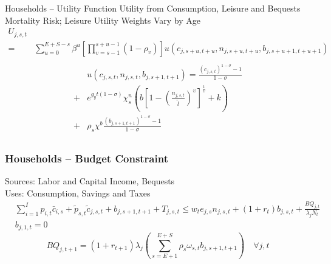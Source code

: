 \documentclass{beamer}
\begin{document}
  \begin{frame}{Households -- Utility Function}\label{Utility Function}
    Utility from Consumption, Leisure and Bequests \\
    Mortality Risk;  Leisure Utility Weights Vary by Age
    \begin{equation}
      \begin{split}
        U_{j,s,t} \\
        = & \sum_{u=0}^{E+S-s}\beta^u\left[\prod_{v=s-1}^{s+u-1}(1-\rho_v)\right] u\left(c_{j,s+u,t+u},n_{j,s+u,t+u},b_{j,s+u+1,t+u+1}\right) \nonumber \\
      \end{split}
    \end{equation}
    \begin{equation}
      \begin{split}
        & u\left(c_{j,s,t},n_{j,s,t},b_{j,s+1,t+1}\right) = \frac{\left(c_{j,s,t}\right)^{1-\sigma} - 1}{1-\sigma} \\
        + & e^{g_y t(1-\sigma)}\chi^n_s\left(b\left[1 - \left(\frac{n_{j,s,t}}{\tilde{l}}\right)^\upsilon\right]^\frac{1}{\upsilon} + k\right) \\
        + & \rho_s\chi^b\frac{\left(b_{j,s+1,t+1}\right)^{1-\sigma} - 1}{1-\sigma} \nonumber \\
      \end{split}
    \end{equation}
    \hyperlink{elliptic}{}
  \end{frame}

  \begin{frame}
    \frametitle{Households -- Budget Constraint}
    Sources: Labor and Capital Income, Bequests \\
    Uses: Consumption, Savings and Taxes
    \begin{equation}
      \begin{split}
        & \sum_{i=1}^{I}p_{i,t}\bar{c}_{i,s} + \tilde{p}_{s,t}\tilde{c}_{j,s,t} + b_{j,s+1,t+1} + T_{j,s,t} \leq  w_t e_{j,s}n_{j,s,t} + \left(1 + r_t\right) b_{j,s,t} + \frac{BQ_{j,t}}{\lambda_jN_t}  \\
        & b_{j,1,t} = 0  \nonumber
      \end{split}
    \end{equation}
    \begin{equation}
      BQ_{j,t+1} = (1+r_{t+1})\lambda_j\left(\sum_{s=E+1}^{E+S}\rho_s\omega_{s,t}b_{j,s+1,t+1}\right) \quad\forall j,t \nonumber
    \end{equation}
  \end{frame}
\end{document}
